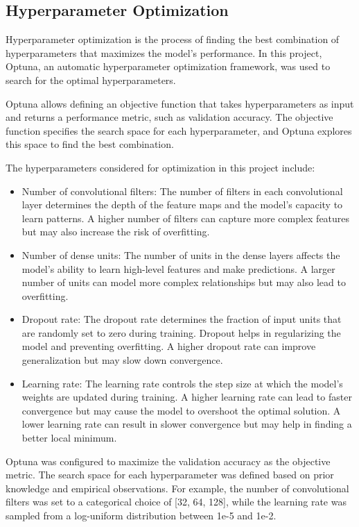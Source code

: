 \documentclass{article}
\begin{document}
\subsection{Hyperparameter Optimization}
Hyperparameter optimization is the process of finding the best combination of hyperparameters that maximizes the model's performance. In this project, Optuna, an automatic hyperparameter optimization framework, was used to search for the optimal hyperparameters.

Optuna allows defining an objective function that takes hyperparameters as input and returns a performance metric, such as validation accuracy. The objective function specifies the search space for each hyperparameter, and Optuna explores this space to find the best combination.

The hyperparameters considered for optimization in this project include:

\begin{itemize}
    \item Number of convolutional filters: The number of filters in each convolutional layer determines the depth of the feature maps and the model's capacity to learn patterns. A higher number of filters can capture more complex features but may also increase the risk of overfitting.
    \item Number of dense units: The number of units in the dense layers affects the model's ability to learn high-level features and make predictions. A larger number of units can model more complex relationships but may also lead to overfitting.
    \item Dropout rate: The dropout rate determines the fraction of input units that are randomly set to zero during training. Dropout helps in regularizing the model and preventing overfitting. A higher dropout rate can improve generalization but may slow down convergence.
    \item Learning rate: The learning rate controls the step size at which the model's weights are updated during training. A higher learning rate can lead to faster convergence but may cause the model to overshoot the optimal solution. A lower learning rate can result in slower convergence but may help in finding a better local minimum.
\end{itemize}

Optuna was configured to maximize the validation accuracy as the objective metric. The search space for each hyperparameter was defined based on prior knowledge and empirical observations. For example, the number of convolutional filters was set to a categorical choice of [32, 64, 128], while the learning rate was sampled from a log-uniform distribution between 1e-5 and 1e-2.
\end{document}
